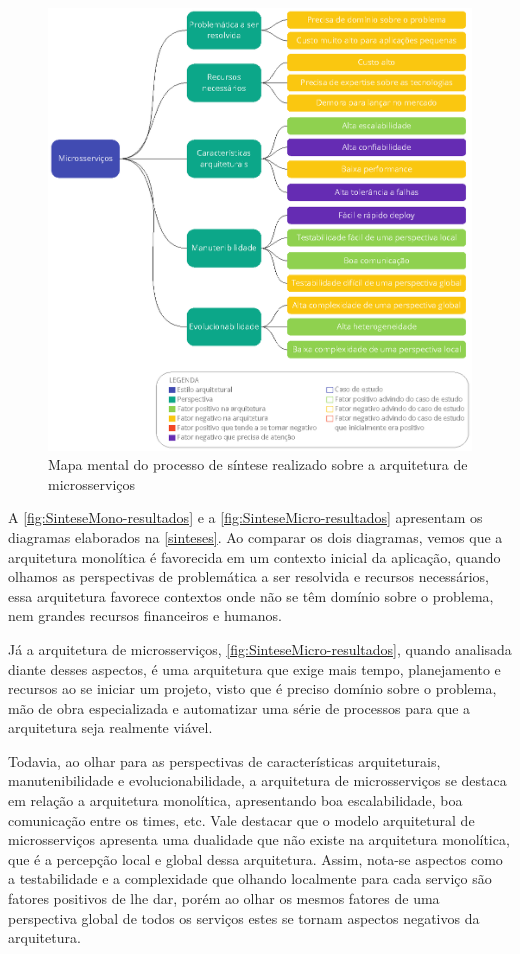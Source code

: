 \begin{figure}[h]
  \centering
  \includegraphics[keepaspectratio=true,scale=1]{figuras/sintese-microsservicos.eps}
  \caption{Mapa mental do processo de síntese realizado sobre a arquitetura de microsserviços\label{fig:SinteseMicro-resultados}}
\end{figure}

A \autoref{fig:SinteseMono-resultados} e a \autoref{fig:SinteseMicro-resultados} apresentam os
diagramas elaborados na \autoref{sinteses}. Ao comparar os dois diagramas, vemos que a arquitetura
monolítica é favorecida em um contexto inicial da aplicação, quando olhamos as perspectivas de
problemática a ser resolvida e recursos necessários, essa arquitetura favorece contextos onde não se
têm domínio sobre o problema, nem grandes recursos financeiros e humanos.

Já a arquitetura de microsserviços, \autoref{fig:SinteseMicro-resultados}, quando analisada diante
desses aspectos, é uma arquitetura que exige mais tempo, planejamento e recursos ao se iniciar um
projeto, visto que é preciso domínio sobre o problema, mão de obra especializada e
automatizar uma série de processos para que a arquitetura seja realmente viável.

Todavia, ao olhar para as perspectivas de características arquiteturais, manutenibilidade e
evolucionabilidade, a arquitetura de microsserviços se destaca em relação a arquitetura monolítica,
apresentando boa escalabilidade, boa comunicação entre os times, etc. Vale destacar que o modelo
arquitetural de microsserviços apresenta uma dualidade que não existe na arquitetura monolítica,
que é a percepção local e global dessa arquitetura. Assim, nota-se aspectos como a testabilidade e a
complexidade que olhando localmente para cada serviço são fatores positivos de lhe dar, porém ao
olhar os mesmos fatores de uma perspectiva global de todos os serviços estes se tornam aspectos
negativos da arquitetura.

